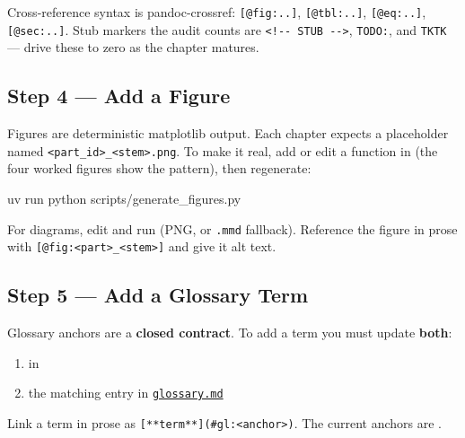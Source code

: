 \documentclass[
]{article}
\newenvironment{Shaded}{}{}
\newcommand{\ExtensionTok}[1]{#1}
\newcommand{\NormalTok}[1]{#1}
\providecommand{\tightlist}{%
  \setlength{\itemsep}{0pt}\setlength{\parskip}{0pt}}
\theoremstyle{plain}
\theoremstyle{definition}
\begin{document}
Cross-reference syntax is pandoc-crossref: \texttt{{[}@fig:..{]}},
\texttt{{[}@tbl:..{]}}, \texttt{{[}@eq:..{]}}, \texttt{{[}@sec:..{]}}.
Stub markers the audit counts are
\texttt{\textless{}!-\/-\ STUB\ -\/-\textgreater{}}, \texttt{TODO:}, and
\texttt{TKTK} --- drive these to zero as the chapter matures.

\subsection{Step 4 --- Add a Figure}\label{step-4-add-a-figure}

Figures are deterministic matplotlib output. Each chapter expects a
placeholder named
\texttt{\textless{}part\_id\textgreater{}\_\textless{}stem\textgreater{}.png}.
To make it real, add or edit a function in
\href{../../src/visualization/plots.py}{}
(the four worked figures show the pattern), then regenerate:

\begin{Shaded}
\begin{Highlighting}[]
\ExtensionTok{uv}\NormalTok{ run python scripts/generate\_figures.py}
\end{Highlighting}
\end{Shaded}

For diagrams, edit  and run
 (PNG, or \texttt{.mmd} fallback).
Reference the figure in prose with
\texttt{{[}@fig:\textless{}part\textgreater{}\_\textless{}stem\textgreater{}{]}}
and give it alt text.

\subsection{Step 5 --- Add a Glossary
Term}\label{step-5-add-a-glossary-term}

Glossary anchors are a \textbf{closed contract}. To add a term you must
update \textbf{both}:

\begin{enumerate}
\def\labelenumi{\arabic{enumi}.}
\tightlist
\item
   in
  \href{../../src/textbook/constants.py}{}
\item
  the matching entry in \href{../glossary.md}{\texttt{glossary.md}}
\end{enumerate}

Link a term in prose as
\texttt{{[}**term**{]}(\#gl:\textless{}anchor\textgreater{})}. The
current anchors are
.
\end{document}
